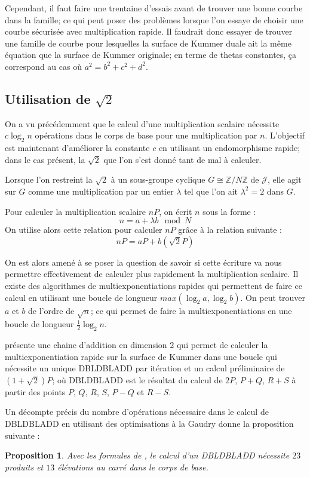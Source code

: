 \documentclass[a4paper]{article}
\newtheorem{proposition}[theoreme]{Proposition}
\theoremstyle{definition}
\theoremstyle{remark}
\numberwithin{equation}{section}
\begin{document}
Cependant, il faut faire une trentaine d'essais avant de trouver une bonne courbe dans la famille; ce qui peut poser des problèmes lorsque l'on essaye de choisir une courbe sécurisée avec multiplication rapide. Il faudrait donc essayer de trouver une famille de courbe pour lesquelles la surface de Kummer duale ait la même équation que la surface de Kummer originale; en terme de thetas constantes, ça correspond au cas où $a^2 = b^2 + c^2 + d^2$.


\subsection{Utilisation de $\sqrt{2}$}

On a vu précédemment que le calcul d'une multiplication scalaire nécessite $c \log_2 n$ opérations dans le corps de base pour une multiplication par $n$. L'objectif est maintenant d'améliorer la constante $c$ en utilisant un endomorphisme rapide; dans le cas présent, la $\sqrt{2}$ que l'on s'est donné tant de mal à calculer.

Lorsque l'on restreint la $\sqrt{2}$ à un sous-groupe cyclique $G \cong \mathbb{Z}/N\mathbb{Z}$ de $\mathcal{J}$, elle agit sur $G$ comme une multiplication par un entier $\lambda$ tel que l'on ait $\lambda^2 = 2$ dans $G$.

Pour calculer la multiplication scalaire $nP$, on écrit $n$ sous la forme :
$$ n = a + \lambda b \mod N$$
On utilise alors cette relation pour calculer $nP$ grâce à la relation suivante :
$$nP = aP + b(\sqrt{2}P)$$

On est alors amené à se poser la question de savoir si cette écriture va nous permettre effectivement de calculer plus rapidement la multiplication scalaire. Il existe des algorithmes de multiexponentiations rapides qui permettent de faire ce calcul en utilisant une boucle de longueur $max(\log_2 a, \log_2 b)$. On peut trouver $a$ et $b$ de l'ordre de $\sqrt{n}$; ce qui permet de faire la multiexponentiations en une boucle de longueur $\frac{1}{2}\log_2 n$.

\citet{bernstein} présente une chaine d'addition en dimension 2 qui permet de calculer la multiexponentiation rapide sur la surface de Kummer dans une boucle qui nécessite un unique DBLDBLADD par itération et un calcul préliminaire de $(1+\sqrt{2})P$; où DBLDBLADD est le résultat du calcul de $2P$, $P+Q$, $R+S$ à partir des points $P$, $Q$, $R$, $S$, $P-Q$ et $R-S$.

Un décompte précis du nombre d'opérations nécessaire dans le calcul de DBLDBLADD en utilisant des optimisations à la Gaudry donne la proposition suivante :
\begin{proposition}
Avec les formules de \citep{gaudry}, le calcul d'un DBLDBLADD nécessite $23$ produits et $13$ élévations au carré dans le corps de base.
\end{proposition}
\end{document}
